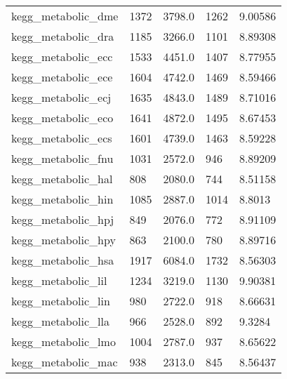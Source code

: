 \begin{longtable}{lllll}
 kegg\_metabolic\_dme                                 & 1372       & 3798.0      & 1262  & 9.00586    \\
 kegg\_metabolic\_dra                                 & 1185       & 3266.0      & 1101  & 8.89308    \\
 kegg\_metabolic\_ecc                                 & 1533       & 4451.0      & 1407  & 8.77955    \\
 kegg\_metabolic\_ece                                 & 1604       & 4742.0      & 1469  & 8.59466    \\
 kegg\_metabolic\_ecj                                 & 1635       & 4843.0      & 1489  & 8.71016    \\
 kegg\_metabolic\_eco                                 & 1641       & 4872.0      & 1495  & 8.67453    \\
 kegg\_metabolic\_ecs                                 & 1601       & 4739.0      & 1463  & 8.59228    \\
 kegg\_metabolic\_fnu                                 & 1031       & 2572.0      & 946   & 8.89209    \\
 kegg\_metabolic\_hal                                 & 808        & 2080.0      & 744   & 8.51158    \\
 kegg\_metabolic\_hin                                 & 1085       & 2887.0      & 1014  & 8.8013     \\
 kegg\_metabolic\_hpj                                 & 849        & 2076.0      & 772   & 8.91109    \\
 kegg\_metabolic\_hpy                                 & 863        & 2100.0      & 780   & 8.89716    \\
 kegg\_metabolic\_hsa                                 & 1917       & 6084.0      & 1732  & 8.56303    \\
 kegg\_metabolic\_lil                                 & 1234       & 3219.0      & 1130  & 9.90381    \\
 kegg\_metabolic\_lin                                 & 980        & 2722.0      & 918   & 8.66631    \\
 kegg\_metabolic\_lla                                 & 966        & 2528.0      & 892   & 9.3284     \\
 kegg\_metabolic\_lmo                                 & 1004       & 2787.0      & 937   & 8.65622    \\
 kegg\_metabolic\_mac                                 & 938        & 2313.0      & 845   & 8.56437    \\

\end{longtable}
